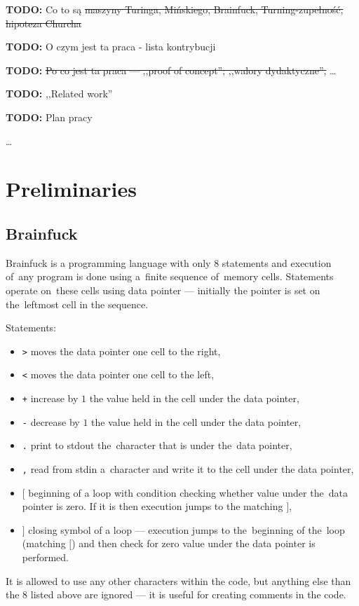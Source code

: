 \documentclass[english,shortabstract,mgr]{iithesis}
\newcommand{\todo}[1]{\textbf{TODO:} #1}
\begin{document}
\todo{Co to są \sout{maszyny Turinga, Mińskiego, Brainfuck, Turning-zupełność, hipoteza Churcha}}

\todo{O czym jest ta praca - lista kontrybucji}

\todo{\sout{Po co jest ta praca --- ,,proof of concept''; ,,walory dydaktyczne'', }\dots}

\todo{,,Related work''}

\todo{Plan pracy}

\ldots

\chapter {Preliminaries}

\section {Brainfuck}

Brainfuck is a programming language with only $8$ statements and execution
of~any program is done using a~finite sequence of~memory cells. Statements
operate on~these cells using data pointer --- initially the pointer is set
on the~leftmost cell in the sequence.

Statements:
\begin{itemize}
  \item \texttt{>} moves the data pointer one cell to the right,
  \item \texttt{<} moves the data pointer one cell to the left,
  \item \texttt{+} increase by $1$ the value held in the cell under the data pointer,
  \item \texttt{-} decrease by $1$ the value held in the cell under the data pointer,
  \item \texttt{.} print to stdout the~character that is under the~data pointer,
  \item \texttt{,} read from stdin a~character and write it to the cell under the data pointer,
  \item \texttt{$[$} beginning of a loop with condition checking whether value under
      the~data pointer is zero. If it is then execution jumps to the matching $]$,
  \item \texttt{$]$} closing symbol of a loop --- execution jumps to the~beginning of the~loop
      (matching $[$) and then check for zero value under the data pointer is performed.
\end{itemize}

It is allowed to use any other characters within the code, but anything else than the $8$
listed above are ignored --- it is useful for creating comments in the code.
\end{document}
